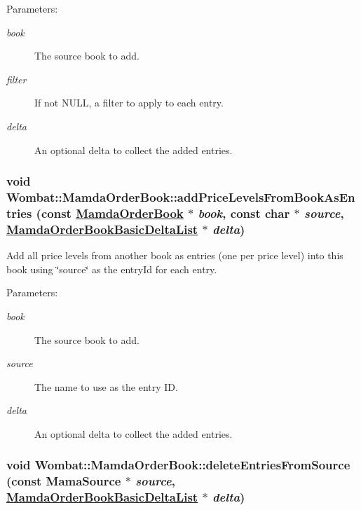 \begin{Desc}
\item[Parameters:]
\begin{description}
\item[{\em book}]The source book to add. \item[{\em filter}]If not NULL, a filter to apply to each entry. \item[{\em delta}]An optional delta to collect the added entries. \end{description}
\end{Desc}
\hypertarget{classWombat_1_1MamdaOrderBook_92ae9d6386ae5ea2dd72c4a1fd729bcd}{
\subsubsection[addPriceLevelsFromBookAsEntries]{\setlength{\rightskip}{0pt plus 5cm}void Wombat::Mamda\-Order\-Book::add\-Price\-Levels\-From\-Book\-As\-Entries (const \hyperlink{classWombat_1_1MamdaOrderBook}{Mamda\-Order\-Book} $\ast$ {\em book}, const char $\ast$ {\em source}, \hyperlink{classWombat_1_1MamdaOrderBookBasicDeltaList}{Mamda\-Order\-Book\-Basic\-Delta\-List} $\ast$ {\em delta})}}
\label{classWombat_1_1MamdaOrderBook_92ae9d6386ae5ea2dd72c4a1fd729bcd}


Add all price levels from another book as entries (one per price level) into this book using \char`\"{}source\char`\"{} as the entry\-Id for each entry. 

\begin{Desc}
\item[Parameters:]
\begin{description}
\item[{\em book}]The source book to add. \item[{\em source}]The name to use as the entry ID. \item[{\em delta}]An optional delta to collect the added entries. \end{description}
\end{Desc}
\hypertarget{classWombat_1_1MamdaOrderBook_475d7893f41395c0f4ba06a503ab114b}{
\subsubsection[deleteEntriesFromSource]{\setlength{\rightskip}{0pt plus 5cm}void Wombat::Mamda\-Order\-Book::delete\-Entries\-From\-Source (const Mama\-Source $\ast$ {\em source}, \hyperlink{classWombat_1_1MamdaOrderBookBasicDeltaList}{Mamda\-Order\-Book\-Basic\-Delta\-List} $\ast$ {\em delta})}}
\label{classWombat_1_1MamdaOrderBook_475d7893f41395c0f4ba06a503ab114b}


